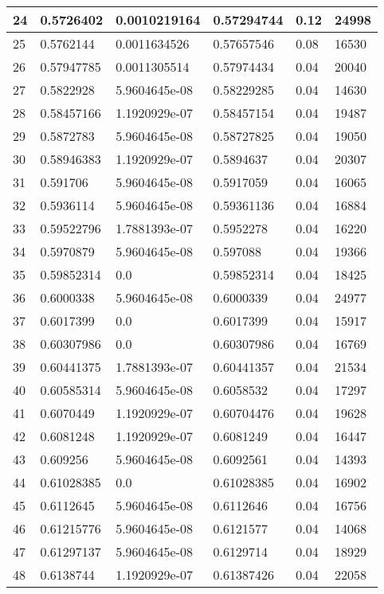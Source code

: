 \begin{longtable}{|l|l|l|l|l|l|}
24 & 0.5726402 & 0.0010219164 & 0.57294744 & 0.12 & 24998 \\ \hline 
25 & 0.5762144 & 0.0011634526 & 0.57657546 & 0.08 & 16530 \\ \hline 
26 & 0.57947785 & 0.0011305514 & 0.57974434 & 0.04 & 20040 \\ \hline 
27 & 0.5822928 & 5.9604645e-08 & 0.58229285 & 0.04 & 14630 \\ \hline 
28 & 0.58457166 & 1.1920929e-07 & 0.58457154 & 0.04 & 19487 \\ \hline 
29 & 0.5872783 & 5.9604645e-08 & 0.58727825 & 0.04 & 19050 \\ \hline 
30 & 0.58946383 & 1.1920929e-07 & 0.5894637 & 0.04 & 20307 \\ \hline 
31 & 0.591706 & 5.9604645e-08 & 0.5917059 & 0.04 & 16065 \\ \hline 
32 & 0.5936114 & 5.9604645e-08 & 0.59361136 & 0.04 & 16884 \\ \hline 
33 & 0.59522796 & 1.7881393e-07 & 0.5952278 & 0.04 & 16220 \\ \hline 
34 & 0.5970879 & 5.9604645e-08 & 0.597088 & 0.04 & 19366 \\ \hline 
35 & 0.59852314 & 0.0 & 0.59852314 & 0.04 & 18425 \\ \hline 
36 & 0.6000338 & 5.9604645e-08 & 0.6000339 & 0.04 & 24977 \\ \hline 
37 & 0.6017399 & 0.0 & 0.6017399 & 0.04 & 15917 \\ \hline 
38 & 0.60307986 & 0.0 & 0.60307986 & 0.04 & 16769 \\ \hline 
39 & 0.60441375 & 1.7881393e-07 & 0.60441357 & 0.04 & 21534 \\ \hline 
40 & 0.60585314 & 5.9604645e-08 & 0.6058532 & 0.04 & 17297 \\ \hline 
41 & 0.6070449 & 1.1920929e-07 & 0.60704476 & 0.04 & 19628 \\ \hline 
42 & 0.6081248 & 1.1920929e-07 & 0.6081249 & 0.04 & 16447 \\ \hline 
43 & 0.609256 & 5.9604645e-08 & 0.6092561 & 0.04 & 14393 \\ \hline 
44 & 0.61028385 & 0.0 & 0.61028385 & 0.04 & 16902 \\ \hline 
45 & 0.6112645 & 5.9604645e-08 & 0.6112646 & 0.04 & 16756 \\ \hline 
46 & 0.61215776 & 5.9604645e-08 & 0.6121577 & 0.04 & 14068 \\ \hline 
47 & 0.61297137 & 5.9604645e-08 & 0.6129714 & 0.04 & 18929 \\ \hline 
48 & 0.6138744 & 1.1920929e-07 & 0.61387426 & 0.04 & 22058 \\ \hline 

\end{longtable}
